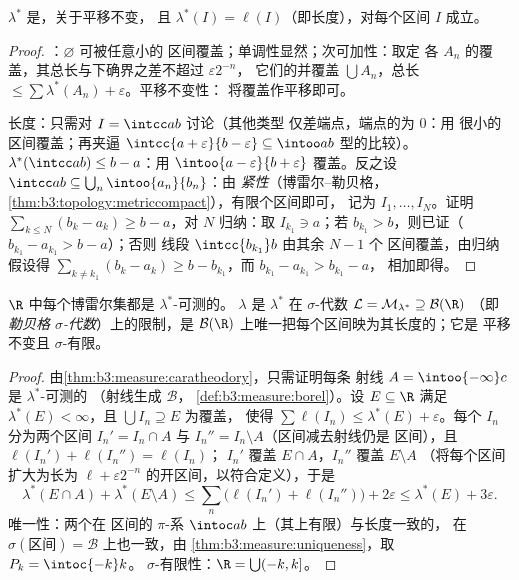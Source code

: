 \begin{lemma}\label{lem:b3:measure:outerbasics}
$\lambda^*$ 是，关于平移不变，
且 $\lambda^*(I) = \ell(I)$（即长度），对每个区间
$I$ 成立。
\end{lemma}

\begin{proof}
：$\varnothing$ 可被任意小的
区间覆盖；单调性显然；次可加性：取定
各 $A_n$ 的覆盖，其总长与下确界之差不超过 $\varepsilon 2^{-n}$，
它们的并覆盖 $\bigcup A_n$，总长 $\leq \sum
\lambda^*(A_n) + \varepsilon$。平移不变性：
将覆盖作平移即可。

长度：只需对 $I = \intcc ab$ 讨论（其他类型
仅差端点，端点的为 $0$：用
很小的区间覆盖；再夹逼 $\intcc{a+\varepsilon}{b -
\varepsilon} \subseteq \intoo ab$ 型的比较）。
$\lambda^*(\intcc ab) \leq b - a$：用
$\intoo{a-\varepsilon}{b+\varepsilon}$ 覆盖。反之设 $\intcc
ab \subseteq \bigcup_n\intoo{a_n}{b_n}$：由
\emph{紧性}（博雷尔–勒贝格，
\cref{thm:b3:topology:metriccompact}），有限个区间即可，
记为 $I_1, \dots, I_N$。证明 $\sum_{k\leq N}(b_k -
a_k) \geq b - a$，对 $N$ 归纳：取 $I_{k_1} \ni a$；若
$b_{k_1} > b$，则已证（$b_{k_1} - a_{k_1} > b - a$）；否则
线段 $\intcc{b_{k_1}}b$ 由其余 $N - 1$ 个
区间覆盖，由归纳假设得 $\sum_{k \neq k_1}(b_k - a_k)
\geq b - b_{k_1}$，而 $b_{k_1} - a_{k_1} > b_{k_1} - a$，
相加即得。
\end{proof}

\begin{theorem}[勒贝格测度]\label{thm:b3:measure:lebesgue}
$\R$ 中每个博雷尔集都是 $\lambda^*$-可测的。
$\lambda$ 是 $\lambda^*$ 在
$\sigma$-代数 $\mathcal L = \mathcal M_{\lambda^*} \supseteq \mathcal B(\R)$
（即\emph{勒贝格 $\sigma$-代数}）上的限制，是
$\mathcal B(\R)$ 上唯一把每个区间映为其长度的；它是
平移不变且 $\sigma$-有限。
\end{theorem}

\begin{proof}
由\cref{thm:b3:measure:caratheodory}，只需证明每条
射线 $A = \intoo{-\infty}c$ 是 $\lambda^*$-可测的
（射线生成 $\mathcal B$，
\cref{def:b3:measure:borel}）。设 $E \subseteq \R$ 满足
$\lambda^*(E) < \infty$，且 $\bigcup I_n \supseteq E$ 为覆盖，
使得 $\sum\ell(I_n) \leq \lambda^*(E) + \varepsilon$。每个
$I_n$ 分为两个区间 $I_n' = I_n \cap A$ 与
$I_n'' = I_n\setminus A$（区间减去射线仍是
区间），且 $\ell(I_n') + \ell(I_n'') = \ell(I_n)$；
$I_n'$ 覆盖 $E \cap A$，$I_n''$ 覆盖 $E \setminus A$
（将每个区间扩大为长为 $\ell +
\varepsilon2^{-n}$ 的开区间，以符合定义），于是
\[
\lambda^*(E\cap A) + \lambda^*(E\setminus A)
\leq \sum_n\bigl(\ell(I_n') + \ell(I_n'')\bigr) + 2\varepsilon
\leq \lambda^*(E) + 3\varepsilon .
\]
唯一性：两个在
区间的 $\pi$-系 $\intoc ab$ 上（其上有限）与长度一致的，
在 $\sigma(\text{区间}) = \mathcal B$ 上也一致，由
\cref{thm:b3:measure:uniqueness}，取 $P_k = \intoc{-k}k$。
$\sigma$-有限性：$\R = \bigcup(-k, k]$。
\end{proof}

